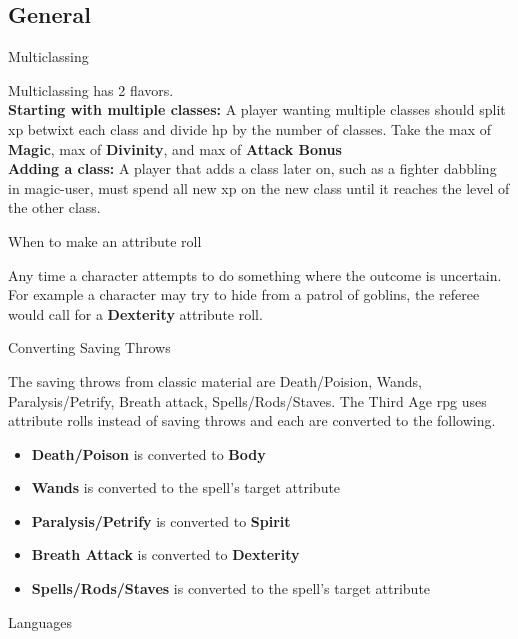 \begin{multicols}{2}
\section*{General} %
\begin{mercHeading}
Multiclassing
\end{mercHeading}
Multiclassing has 2 flavors.\\
\textbf{Starting with multiple classes:} A player wanting multiple classes should split xp betwixt each class and divide hp by the number of classes. Take the max of \textbf{Magic}, max of \textbf{Divinity}, and max of \textbf{Attack Bonus} \\
\textbf{Adding a class:} A player that adds a class later on, such as a fighter dabbling in magic-user, must spend all new xp on the new class until it reaches the level of the other class.
\begin{mercHeading}
When to make an attribute roll
\end{mercHeading}
Any time a character attempts to do something where the outcome is uncertain. For example a character may try to hide from a patrol of goblins, the referee would call for a \textbf{Dexterity} attribute roll.
\begin{mercHeading}
Converting Saving Throws
\end{mercHeading}
The saving throws from classic material are Death/Poision, Wands, Paralysis/Petrify, Breath attack, Spells/Rods/Staves. The Third Age rpg uses attribute rolls instead of saving throws and each are converted to the following.
\begin{itemize}
\setlength\itemsep{0em}
	\item \textbf{Death/Poison} is converted to \textbf{Body}
	\item \textbf{Wands} is converted to the spell's target attribute
	\item \textbf{Paralysis/Petrify} is converted to \textbf{Spirit}
	\item \textbf{Breath Attack} is converted to \textbf{Dexterity}
	\item \textbf{Spells/Rods/Staves} is converted to the spell's target attribute
\end{itemize}


\begin{mercHeading}
Languages
\end{mercHeading}


\end{multicols}
